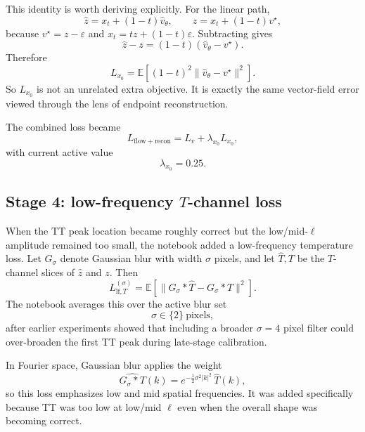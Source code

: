 \documentclass[11pt]{article}
\newcommand{\EE}{\mathbb{E}}
\newcommand{\e}{\varepsilon}
\begin{document}
This identity is worth deriving explicitly. For the linear path,
\begin{equation}
  \hat z = x_t + (1-t)\hat v_\theta,
  \qquad
  z = x_t + (1-t)v^\star,
\end{equation}
because \(v^\star=z-\e\) and \(x_t=t z + (1-t)\e\). Subtracting gives
\begin{equation}
  \hat z-z = (1-t)(\hat v_\theta-v^\star).
\end{equation}
Therefore
\begin{equation}
  L_{x_0}
  =
  \EE\!\left[(1-t)^2 \|\hat v_\theta-v^\star\|^2\right].
\end{equation}
So \(L_{x_0}\) is not an unrelated extra objective. It is exactly the same vector-field error viewed through the lens of endpoint reconstruction.

The combined loss became
\begin{equation}
  L_{\mathrm{flow+recon}}
  =
  L_v + \lambda_{x_0}L_{x_0},
\end{equation}
with current active value
\begin{equation}
  \lambda_{x_0}=0.25.
\end{equation}

\subsection{Stage 4: low-frequency \(T\)-channel loss}

When the TT peak location became roughly correct but the low/mid-\(\ell\) amplitude remained too small, the notebook added a low-frequency temperature loss. Let \(G_\sigma\) denote Gaussian blur with width \(\sigma\) pixels, and let \(\hat T,T\) be the \(T\)-channel slices of \(\hat z\) and \(z\). Then
\begin{equation}
  L_{\mathrm{lf},T}^{(\sigma)}
  =
  \EE\left[
    \|G_\sigma * \hat T - G_\sigma * T\|^2
  \right].
\end{equation}
The notebook averages this over the active blur set
\begin{equation}
  \sigma \in \{2\}\ \text{pixels},
\end{equation}
after earlier experiments showed that including a broader \(\sigma=4\) pixel filter could over-broaden the first TT peak during late-stage calibration.

In Fourier space, Gaussian blur applies the weight
\begin{equation}
  \widehat{G_\sigma * T}(k)
  =
  e^{-\frac12 \sigma^2 |k|^2}\,\hat T(k),
\end{equation}
so this loss emphasizes low and mid spatial frequencies. It was added specifically because TT was too low at low/mid \(\ell\) even when the overall shape was becoming correct.
\end{document}
